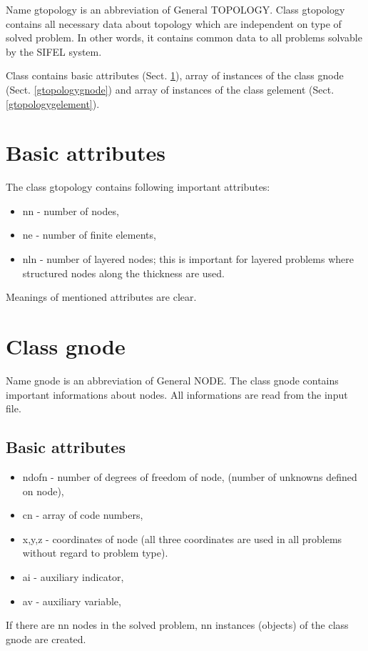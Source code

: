 Name {\sf gtopology} is an abbreviation of General TOPOLOGY. Class {\sf gtopology} contains
all necessary data about topology which are independent on type of solved
problem. In other words, it contains common data to all problems solvable
by the SIFEL system.

Class  contains basic attributes (Sect. \ref{gtopologybatt}),
array of instances of the class {\sf gnode} (Sect. \ref{gtopologygnode})
and array of instances of the class {\sf gelement} (Sect. \ref{gtopologygelement}).

\section{Basic attributes}
\label{gtopologybatt}
The class {\sf gtopology} contains following important attributes:
\begin{itemize}
\item{nn - number of nodes,}
\item{ne - number of finite elements,}
\item{nln - number of layered nodes; this is important for layered problems where
structured nodes along the thickness are used.}
\end{itemize}
Meanings of mentioned attributes are clear.

\section{Class {\sf gnode}}
\label{gtopologygnode}
Name {\sf gnode} is an abbreviation of General NODE. The class {\sf gnode} contains important
informations about nodes. All informations are read from the input file.
\subsection{Basic attributes}
\begin{itemize}
\item{{\sf ndofn} - number of degrees of freedom of node, (number of unknowns defined on node),}
\item{{\sf cn} - array of code numbers,}
\item{{\sf x,y,z} - coordinates of node (all three coordinates are used in all problems without regard to
problem type).}
\item{{\sf ai} - auxiliary indicator,}
\item{{\sf av} - auxiliary variable,}
\end{itemize}
If there are {\sf nn} nodes in the solved problem, {\sf nn} instances (objects) of the class {\sf gnode} are created.

